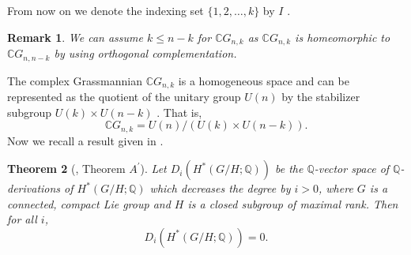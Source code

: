 \documentclass{amsart}
\newtheorem{theorem}{Theorem}[section]
\newtheorem{remark}[theorem]{Remark}
\newcommand{\rank}{\mathrm{Rank}}
\begin{document}
	From %
now on we %
denote the indexing set $\{1,2,\dots, k\}$ by $I$%
.
	\begin{remark}
		We can assume  $k\leq n-k$ for  $\mathbb{C}G_{n,k}$ as $\mathbb{C}G_{n,k}$ is homeomorphic to $\mathbb{C}G_{n,n-k}$ by using orthogonal complementation.
	\end{remark}
	The %
complex Grassmannian $\mathbb{C}G_{n,k}$ is a homogeneous space and can be represented as the quotient of the unitary group $U(n)$ by the stabilizer subgroup %
$U(k)\times U(n-k)$ . That is, 
	\begin{equation}\label{cgn as hom}
		\mathbb{C}G_{n,k} = U(n)/ (U(k)\times U(n-k)). 
	\end{equation} Now %
we recall a result given %
in \cite{shiga-tezuka}.    
	\begin{theorem}[\cite{shiga-tezuka}, Theorem \(A^{'}\)]\label{Tezuka}
		Let %
$D_i(H^*(G/H;\mathbb{Q}))$ be the $\mathbb{Q}$-vector space of $\mathbb{Q}$-derivations of $H^*(G/H;\mathbb{Q})$ which decreases the degree %
by $i>0$, where %
$G$ is %
a connected, compact Lie group and $H$ is a closed subgroup of maximal rank.
		Then for %
all $i$, $$D_i(H^*(G/H;\mathbb{Q})) =0.$$  
	\end{theorem}
\end{document}

